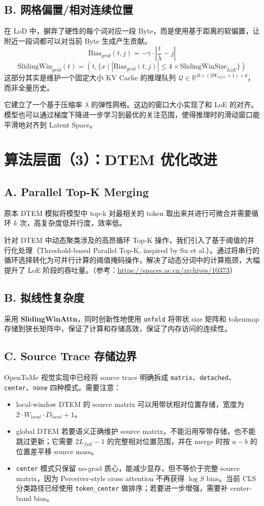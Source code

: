 \documentclass[a4paper,11pt]{article}
\begin{document}
\subsection*{B. 网格偏置/相对连续位置}
在 LoD 中，摒弃了硬性的每个词对应一段 Byte，而是使用基于距离的软偏置，让附近一段词都可以对当前 Byte 生成产生贡献。
$$
\text{Bias}_{grid}(t, j) = - \gamma \cdot \left| \frac{t}{\lambda} - j \right|
$$
$$
\text{SlidingWin}_{grid}(t)=(t,\{x\mid|\text{Bias}_{grid}(t, j)|\le4\times\text{SlidingWinSize}_{LoE}\})
$$
这部分其实是维护一个固定大小 KV Cache 的推理队列 $\mathcal{Q} \in \mathbb{R}^{B \times (2W_{infer}+1) \times d}$，而非全量历史。

它建立了一个基于压缩率 $\lambda$ 的弹性网格。这边的窗口大小实现了和 LoE 的对齐。模型也可以通过梯度下降进一步学习到最优的关注范围，使得推理时的滑动窗口能平滑地对齐到 Latent Space。

\section*{算法层面（3）：DTEM 优化改进}

\subsection*{A. Parallel Top-K Merging}
原本 DTEM 模拟将模型中 top-k 对最相关的 token 取出来并进行可微合并需要循环 $k$ 次，高复杂度低并行度，效率低。

针对 DTEM 中动态聚类涉及的高昂循环 Top-K 操作，我们引入了基于阈值的并行化处理（Threshold-based Parallel Top-K, inspired by Su et al.）。通过将串行的循环选择转化为可并行计算的阈值掩码操作，解决了动态分词中的计算瓶颈，大幅提升了 LoE 阶段的吞吐量。（参考：\url{https://spaces.ac.cn/archives/10373}）

\subsection*{B. 拟线性复杂度}
采用 \textbf{SlidingWinAttn}，同时创新性地使用 \texttt{unfold} 将带状 size 矩阵和 tokenmap 存储到狭长矩阵中，保证了计算和存储高效，保证了内存访问的连续性。

\subsection*{C. Source Trace 存储边界}
OpenToMe 视觉实现中已经将 source trace 明确拆成 \texttt{matrix}、\texttt{detached}、\texttt{center}、\texttt{none} 四种模式。需要注意：
\begin{itemize}
    \item local-window DTEM 的 source matrix 可以用带状相对位置存储，宽度为 $2\cdot W_{local}\cdot D_{local}+1$。
    \item global DTEM 若要语义正确维护 source matrix，不能沿用窄带存储，也不能跳过更新；它需要 $2L_{full}-1$ 的完整相对位置范围，并在 merge 时按 $a-b$ 的位置差平移 source mass。
    \item \texttt{center} 模式只保留 no-grad 质心，能减少显存，但不等价于完整 source matrix，因为 Perceiver-style cross attention 不再获得 $\log S$ bias。当前 CLS 分类路径已经使用 \texttt{token\_center} 做排序；若要进一步增强，需要补 center-band bias。
\end{itemize}
\end{document}
